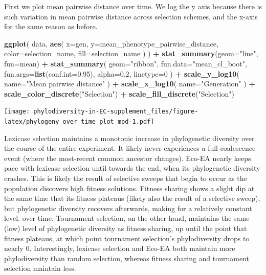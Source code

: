 \documentclass[]{book}
\newenvironment{Shaded}{\begin{snugshade}}{\end{snugshade}}
\newcommand{\DataTypeTok}[1]{\textcolor[rgb]{0.13,0.29,0.53}{#1}}
\newcommand{\DecValTok}[1]{\textcolor[rgb]{0.00,0.00,0.81}{#1}}
\newcommand{\FloatTok}[1]{\textcolor[rgb]{0.00,0.00,0.81}{#1}}
\newcommand{\KeywordTok}[1]{\textcolor[rgb]{0.13,0.29,0.53}{\textbf{#1}}}
\newcommand{\NormalTok}[1]{#1}
\newcommand{\OperatorTok}[1]{\textcolor[rgb]{0.81,0.36,0.00}{\textbf{#1}}}
\newcommand{\StringTok}[1]{\textcolor[rgb]{0.31,0.60,0.02}{#1}}
\begin{document}
First we plot mean pairwise distance over time. We log the y axis because there is such variation in mean pairwise distance across selection schemes, and the x-axis for the same reason as before.

\begin{Shaded}
\begin{Highlighting}[]
\KeywordTok{ggplot}\NormalTok{(}
\NormalTok{    data,}
    \KeywordTok{aes}\NormalTok{(}
      \DataTypeTok{x=}\NormalTok{gen,}
      \DataTypeTok{y=}\NormalTok{mean_phenotype_pairwise_distance,}
      \DataTypeTok{color=}\NormalTok{selection_name,}
      \DataTypeTok{fill=}\NormalTok{selection_name}
\NormalTok{    )}
\NormalTok{  ) }\OperatorTok{+}
\StringTok{  }\KeywordTok{stat_summary}\NormalTok{(}\DataTypeTok{geom=}\StringTok{"line"}\NormalTok{, }\DataTypeTok{fun=}\NormalTok{mean) }\OperatorTok{+}
\StringTok{  }\KeywordTok{stat_summary}\NormalTok{(}
    \DataTypeTok{geom=}\StringTok{"ribbon"}\NormalTok{,}
    \DataTypeTok{fun.data=}\StringTok{"mean_cl_boot"}\NormalTok{,}
    \DataTypeTok{fun.args=}\KeywordTok{list}\NormalTok{(}\DataTypeTok{conf.int=}\FloatTok{0.95}\NormalTok{),}
    \DataTypeTok{alpha=}\FloatTok{0.2}\NormalTok{,}
    \DataTypeTok{linetype=}\DecValTok{0}
\NormalTok{  ) }\OperatorTok{+}
\StringTok{  }\KeywordTok{scale_y_log10}\NormalTok{(}
    \DataTypeTok{name=}\StringTok{"Mean pairwise distance"}
\NormalTok{  ) }\OperatorTok{+}
\StringTok{  }\KeywordTok{scale_x_log10}\NormalTok{(}
    \DataTypeTok{name=}\StringTok{"Generation"}
\NormalTok{  ) }\OperatorTok{+}
\StringTok{  }\KeywordTok{scale_color_discrete}\NormalTok{(}\StringTok{"Selection"}\NormalTok{) }\OperatorTok{+}
\StringTok{  }\KeywordTok{scale_fill_discrete}\NormalTok{(}\StringTok{"Selection"}\NormalTok{)}
\end{Highlighting}
\end{Shaded}

\texttt{[image: phylodiversity-in-EC-supplement\_files/figure-latex/phylogeny\_over\_time\_plot\_mpd-1.pdf]}

Lexicase selection maintains a monotonic increase in phylogenetic diversity over the course of the entire experiment. It likely never experiences a full coalescence event (where the most-recent common ancestor changes). Eco-EA nearly keeps pace with lexicase selection until towards the end, when its phylogenetic diversity crashes. This is likely the result of selective sweeps that begin to occur as the population discovers high fitness solutions. Fitness sharing shows a slight dip at the same time that its fitness plateaus (likely also the result of a selective sweep), but phylogenetic diversity recovers afterwards, making for a relatively constant level. over time. Tournament selection, on the other hand, maintains the same (low) level of phylogenetic diversity as fitness sharing, up until the point that fitness plateaus, at which point tournament selection's phylodiversity drops to nearly 0. Interestingly, lexicase selection and Eco-EA both maintain more phylodiversity than random selection, whereas fitness sharing and tournament selection maintain less.
\end{document}
